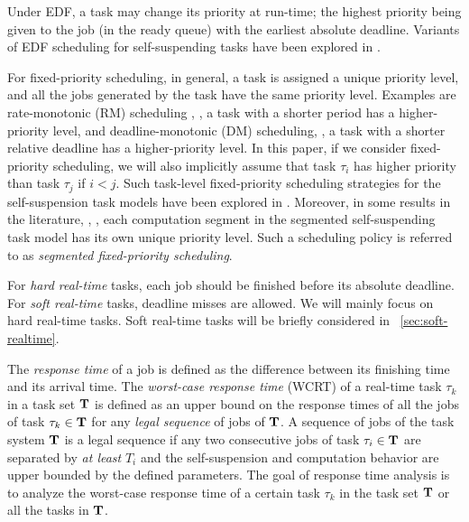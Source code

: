 Under EDF, 
a task may change its priority at run-time; the highest priority being given to the job (in the ready queue) with the earliest
absolute deadline. Variants of EDF scheduling for self-suspending
tasks have been explored in
\cite{RTSS-ChenL14,Liu_2014,DBLP:conf/ecrts/Devi03,WC16-suspend-DATE,Bruggen16RTNS}.

For fixed-priority scheduling, in general, a task is assigned a
unique priority level, and all the jobs generated by the task have the
same priority level. Examples are rate-monotonic (RM) scheduling
\cite{Liu_1973}, \ie, a task with a shorter period has a
higher-priority level, and deadline-monotonic (DM) scheduling, \ie,
a task with a shorter relative deadline has a higher-priority level.
In this paper, if we consider fixed-priority scheduling, we will also implicitly assume that task $\tau_i$ has higher priority than task $\tau_j$ if $i < j$.
Such task-level fixed-priority scheduling strategies for the self-suspension task models have been explored in
\cite{Raj:suspension1991,RTCSA-KimCPKH95,MingLiRTCSA1994,PH:rtss98,ECRTS-AudsleyB04,RTAS-AudsleyB04,RTCSA-BletsasA05,LR:rtas10,RTSS-KimANR13,LiuChen:rtss2014,huangpass:dac2015,Huang:multiseg,WC16-suspend-DATE,ChenECRTS2016-suspension}.
Moreover, in some results in the literature, \eg,
\cite{RTSS-KimANR13,DBLP:journals/ieicet/DingTT09}, each computation
segment in the segmented self-suspending task model has its own unique
priority level. Such a scheduling
policy is referred to as \emph{segmented fixed-priority scheduling}.

For \emph{hard real-time} tasks, each job should be finished before its
absolute deadline. For \emph{soft real-time} tasks, deadline misses are
allowed. We will mainly focus on hard real-time tasks. 
Soft real-time tasks will be briefly considered in
\mysectionref{}~\ref{sec:soft-realtime}.


The \emph{response time} of a job is defined as the difference between its finishing time and its arrival
time. The \emph{worst-case response time} (WCRT) of a real-time task
$\tau_k$ in a task set ${\bf T}$ is defined as an upper bound on the
response times of all the jobs of task $\tau_k \in {\bf T}$ for any
\emph{legal sequence} of jobs of ${\bf T}$. A sequence of jobs of
the task system ${\bf T}$ is a legal sequence if any two consecutive
jobs of task $\tau_i \in {\bf T}$ are separated by \emph{at least}
$T_i$ and the self-suspension and computation behavior are upper
bounded by the defined parameters. The goal of response time analysis is to
analyze the worst-case response time of a certain task $\tau_k$ in the
task set ${\bf T}$ or all the tasks in ${\bf T}$.

